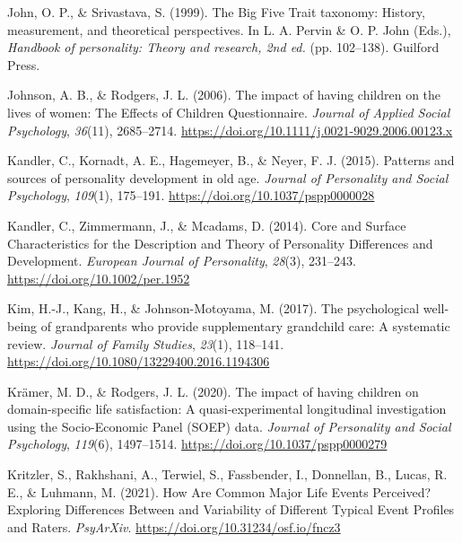 \documentclass[
  english,
  man,floatsintext]{apa7}
\begin{document}
\leavevmode\hypertarget{ref-johnBigFiveTrait1999}{}%
John, O. P., \& Srivastava, S. (1999). The Big Five Trait taxonomy: History, measurement, and theoretical perspectives. In L. A. Pervin \& O. P. John (Eds.), \emph{Handbook of personality: Theory and research, 2nd ed.} (pp. 102--138). Guilford Press.

\leavevmode\hypertarget{ref-johnsonImpactHavingChildren2006}{}%
Johnson, A. B., \& Rodgers, J. L. (2006). The impact of having children on the lives of women: The Effects of Children Questionnaire. \emph{Journal of Applied Social Psychology}, \emph{36}(11), 2685--2714. \url{https://doi.org/10.1111/j.0021-9029.2006.00123.x}

\leavevmode\hypertarget{ref-kandlerPatternsSourcesPersonality2015a}{}%
Kandler, C., Kornadt, A. E., Hagemeyer, B., \& Neyer, F. J. (2015). Patterns and sources of personality development in old age. \emph{Journal of Personality and Social Psychology}, \emph{109}(1), 175--191. \url{https://doi.org/10.1037/pspp0000028}

\leavevmode\hypertarget{ref-kandlerCoreSurfaceCharacteristics2014}{}%
Kandler, C., Zimmermann, J., \& Mcadams, D. (2014). Core and Surface Characteristics for the Description and Theory of Personality Differences and Development. \emph{European Journal of Personality}, \emph{28}(3), 231--243. \url{https://doi.org/10.1002/per.1952}

\leavevmode\hypertarget{ref-kimPsychologicalWellbeingGrandparents2017}{}%
Kim, H.-J., Kang, H., \& Johnson-Motoyama, M. (2017). The psychological well-being of grandparents who provide supplementary grandchild care: A systematic review. \emph{Journal of Family Studies}, \emph{23}(1), 118--141. \url{https://doi.org/10.1080/13229400.2016.1194306}

\leavevmode\hypertarget{ref-kramerImpactHavingChildren2020}{}%
Krämer, M. D., \& Rodgers, J. L. (2020). The impact of having children on domain-specific life satisfaction: A quasi-experimental longitudinal investigation using the Socio-Economic Panel (SOEP) data. \emph{Journal of Personality and Social Psychology}, \emph{119}(6), 1497--1514. \url{https://doi.org/10.1037/pspp0000279}

\leavevmode\hypertarget{ref-kritzlerHowAreCommon2021}{}%
Kritzler, S., Rakhshani, A., Terwiel, S., Fassbender, I., Donnellan, B., Lucas, R. E., \& Luhmann, M. (2021). How Are Common Major Life Events Perceived? Exploring Differences Between and Variability of Different Typical Event Profiles and Raters. \emph{PsyArXiv}. \url{https://doi.org/10.31234/osf.io/fncz3}
\end{document}
